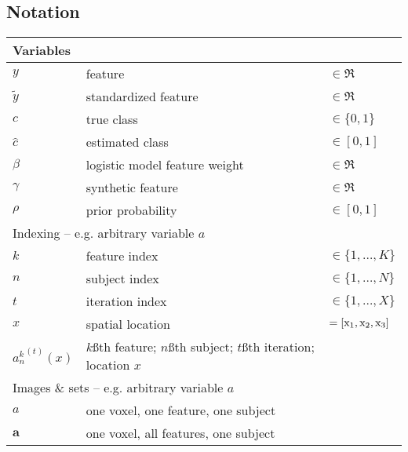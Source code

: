 \begin{singlespacing}
\subsection*{Notation}
\begin{table}[H]
  \begin{tabular}{lll}
  	\hline
  	\multicolumn{3}{l}{Variables}                                                              \\ \hline
  	$y$                   & feature                                      & $\in\Re$            \\
  	$\tilde{y}$           & standardized feature                         & $\in\Re$            \\
  	$c$                   & true class                                   & $\in\{0,1\}$        \\
  	$\hat{c}$             & estimated class                              & $\in[0,1]$          \\
  	$\beta$               & logistic model feature weight                & $\in\Re$            \\
  	$\gamma$              & synthetic feature                            & $\in\Re$            \\
  	$\rho$                & prior probability                            & $\in[0,1]$          \\ \hline
  	\multicolumn{3}{l}{Indexing -- e.g. arbitrary variable $a$}                                \\ \hline
  	$k$                   & feature index                                & $\in \{1,\dots,K\}$ \\
  	$n$                   & subject index                                & $\in \{1,\dots,N\}$ \\
  	$t$                   & iteration index                              & $\in \{1,\dots,X\}$ \\
  	$x$                   & spatial location                             & $= [\mathrm{x}_1,\mathrm{x}_2,\mathrm{x}_3]$          \\
   	${a_n^k}^{(t)}(x)$    & $k$\ss{th} feature; $n$\ss{th} subject; $t$\ss{th} iteration; location $x$ & \\ \hline
  	\multicolumn{3}{l}{Images \& sets -- e.g. arbitrary variable $a$}                          \\ \hline
  	$a$                   & one voxel, one feature, one subject          &                     \\
  	$\bm{a}$              & one voxel, all features, one subject         &                     \\

\end{tabular}
\end{table}
\end{singlespacing}
